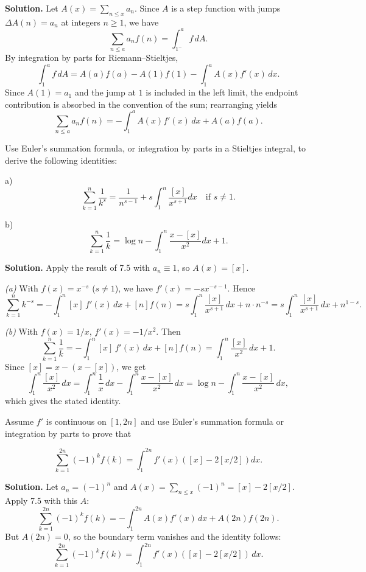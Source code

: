 \noindent\textbf{Solution.}
Let $A(x)=\sum_{n\le x}a_n$. Since $A$ is a step function with jumps $\Delta A(n)=a_n$ at integers $n\ge 1$, we have
\[\sum_{n\le a} a_n f(n)=\int_{1^-}^{a} f\,dA.
\]
By integration by parts for Riemann–Stieltjes,
\[\int_{1}^{a} f\,dA= A(a)f(a)-A(1)f(1)-\int_{1}^{a} A(x) f'(x)\,dx.
\]
Since $A(1)=a_1$ and the jump at $1$ is included in the left limit, the endpoint contribution is absorbed in the convention of the sum; rearranging yields
\[\sum_{n\le a} a_n f(n)= -\int_{1}^{a} A(x) f'(x)\,dx + A(a)f(a).\]
\medskip

\begin{problembox}
Use Euler's summation formula, or integration by parts in a Stieltjes integral, to derive the following identities:

a) \[ \sum_{k=1}^n \frac{1}{k^s} = \frac{1}{n^{s-1}} + s \int_1^n \frac{[x]}{x^{s+1}} dx \quad \text{if } s \neq 1. \]

b) \[ \sum_{k=1}^n \frac{1}{k} = \log n - \int_1^n \frac{x - [x]}{x^2} dx + 1. \]
\end{problembox}

\noindent\textbf{Solution.}
Apply the result of 7.5 with $a_n\equiv 1$, so $A(x)=[x]$.

\textit{(a)} With $f(x)=x^{-s}$ ($s\ne 1$), we have $f'(x)=-s x^{-s-1}$. Hence
\[\sum_{k=1}^n k^{-s} = -\int_1^n [x]\,f'(x)\,dx + [n] f(n) = s\int_1^n \frac{[x]}{x^{s+1}}\,dx + n\cdot n^{-s}= s\int_1^n \frac{[x]}{x^{s+1}}\,dx + n^{1-s}.
\]

\textit{(b)} With $f(x)=1/x$, $f'(x)=-1/x^2$. Then
\[\sum_{k=1}^n \frac{1}{k} = -\int_1^n [x]\,f'(x)\,dx + [n]f(n) = \int_1^n \frac{[x]}{x^2}\,dx + 1.
\]
Since $[x]=x-(x-[x])$, we get
\[\int_1^n \frac{[x]}{x^2}\,dx = \int_1^n \frac{1}{x}\,dx - \int_1^n \frac{x-[x]}{x^2}\,dx = \log n - \int_1^n \frac{x-[x]}{x^2}\,dx,
\]
which gives the stated identity.
\medskip

\begin{problembox}
Assume $f'$ is continuous on $[1, 2n]$ and use Euler's summation formula or integration by parts to prove that

\[ \sum_{k=1}^{2n} (-1)^k f(k) = \int_1^{2n} f'(x)([x] - 2[x/2]) dx. \]
\end{problembox}

\noindent\textbf{Solution.}
Let $a_n=(-1)^n$ and $A(x)=\sum_{n\le x}(-1)^n=[x]-2[x/2]$. Apply 7.5 with this $A$:
\[\sum_{k=1}^{2n}(-1)^k f(k)= -\int_1^{2n} A(x) f'(x)\,dx + A(2n) f(2n).
\]
But $A(2n)=0$, so the boundary term vanishes and the identity follows:
\[\sum_{k=1}^{2n}(-1)^k f(k)=\int_1^{2n} f'(x)([x]-2[x/2])\,dx.\]
\medskip

